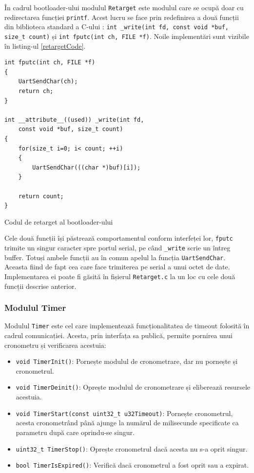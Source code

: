 \documentclass[12pt,a4paper,titlepage]{report}
\begin{document}
În cadrul bootloader-ului modulul \texttt{Retarget} este modulul care se ocupă doar cu redirectarea funcției \texttt{printf}. Acest lucru se face prin redefinirea a două funcții din biblioteca standard a C-ului \cite{retarget}: \texttt{int \_write(int fd, const void *buf, size\_t count)} și \texttt{int fputc(int ch, FILE *f)}. Noile implementări sunt vizibile în listing-ul \ref{retargetCode}.

\begin{listing}[h]
\begin{verbatim}
int fputc(int ch, FILE *f)
{
    UartSendChar(ch);
    return ch;
}

int __attribute__((used)) _write(int fd,
    const void *buf, size_t count)
{
    for(size_t i=0; i< count; ++i)
    {
        UartSendChar(((char *)buf)[i]);
    }

    return count;
}
\end{verbatim}

\caption{Codul de retarget al bootloader-ului}
\label{retargetCode}
\end{listing}

Cele două funcții își păstrează comportamentul conform interfeței lor, \texttt{fputc} trimite un singur caracter spre portul serial, pe când \texttt{\_write} scrie un întreg buffer. Totuși ambele funcții au în comun apelul la funcția \texttt{UartSendChar}. Aceasta fiind de fapt cea care face trimiterea pe serial a unui octet de date. Implementarea ei poate fi găsită în fișierul \texttt{Retarget.c} la un loc cu cele două funcții descrise anterior.

\subsubsection{Modulul Timer}
Modulul \texttt{Timer} este cel care implementează funcționalitatea de timeout folosită în cadrul comunicației.
Acesta, prin interfața sa publică, permite pornirea unui cronometru și verificarea acestuia:

\begin{itemize}
\item \texttt{void TimerInit()}: Pornește modulul de cronometrare, dar nu pornește și cronometrul.
\item \texttt{void TimerDeinit()}: Oprește modulul de cronometrare și eliberează resursele acestuia.
\item \texttt{void TimerStart(const uint32\_t u32Timeout)}: Pornește cronometrul, acesta cronometrând până ajunge la numărul de milisecunde specificate ca parametru după care oprindu-se singur.
\item \texttt{uint32\_t TimerStop()}: Oprește cronometrul dacă acesta nu s-a oprit singur.
\item \texttt{bool TimerIsExpired()}: Verifică dacă cronometrul a fost oprit sau a expirat.
\end{itemize}
\end{document}
